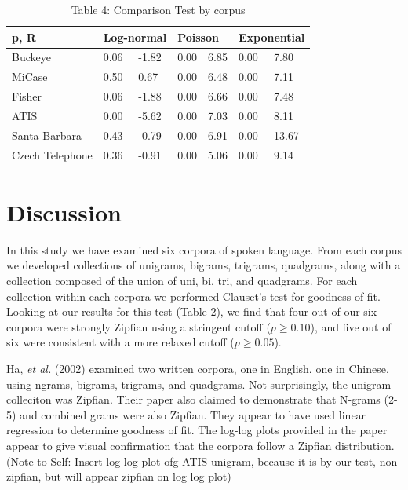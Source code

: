 \documentclass[12pt]{article}
\begin{document}
\begin{table}[H]
\caption{Table 4: Comparison Test by corpus}
\begin{center}

\begin{tabular}{| *{7}{l|} }
    \hline
p, R& \multicolumn{2}{l|}{Log-normal}
            & \multicolumn{2}{l|}{Poisson}
                    & \multicolumn{2}{l|}{Exponential}\\
    \hline
Buckeye  & 0.06 & -1.82 & 0.00 & 6.85 & 0.00 & 7.80 \\
    \hline
MiCase & 0.50 & 0.67 & 0.00 & 6.48 & 0.00 & 7.11  \\
    \hline
Fisher   & 0.06 & -1.88 & 0.00 & 6.66 & 0.00 & 7.48\\
    \hline
ATIS   & 0.00 & -5.62 & 0.00 & 7.03 & 0.00 & 8.11\\
    \hline
Santa Barbara  & 0.43 & -0.79 & 0.00 & 6.91 & 0.00 & 13.67  \\
    \hline
Czech Telephone & 0.36 & -0.91 & 0.00 & 5.06 & 0.00 & 9.14   \\
    \hline
\end{tabular}
\end{center}
\end{table}

\section{Discussion}

In this study we have examined six corpora of spoken language.  From each corpus we developed collections of unigrams, bigrams, trigrams, quadgrams, along with a collection composed of the union of uni, bi, tri, and quadgrams. For each collection within each corpora we performed Clauset's test for goodness of fit.  Looking at our results for this test (Table 2), we find that four out of our six corpora were strongly Zipfian using a stringent cutoff ($p \geq 0.10$), and five out of six were consistent with a more relaxed cutoff ($p \geq 0.05$).

Ha, \emph{et al.} (2002) examined two written corpora, one in English. one in Chinese, using ngrams, bigrams, trigrams, and quadgrams.  Not surprisingly, the unigram colleciton was Zipfian.  Their paper also claimed to demonstrate that N-grams (2-5) and combined grams were also Zipfian.  They appear to have used linear regression to determine goodness of fit.  The log-log plots provided in the paper appear to give visual confirmation that the corpora follow a Zipfian distribution. 
(Note to Self: Insert log log plot ofg ATIS unigram, because it is by our test, non-zipfian, but will appear zipfian on log log plot)
\end{document}
